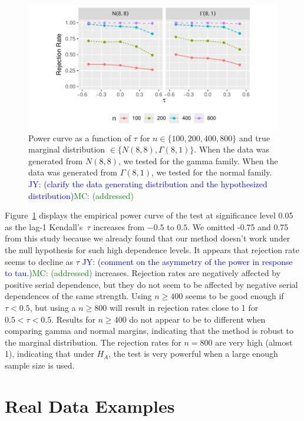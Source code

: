 \documentclass[12pt, titlepage, letterpaper]{article}
\newcommand{\jy}[1]{\textcolor{blue}{JY: (#1)}}
\newcommand{\mc}[1]{\textcolor{green}{MC: (#1)}}
\begin{document}
\begin{figure}[tbp]
  \centering
  \includegraphics[scale=1]{figures/rr}
  \caption{Power curve as a function of $\tau$ for
    $n \in \{100, 200, 400, 800\}$ and true marginal distribution 
    $\in \{N(8,8), \Gamma(8,1)\}$. When the data was generated from $N(8,8)$,
    we tested for the gamma family. When the data was generated from 
    $\Gamma(8,1)$, we tested for the normal family. \jy{clarify the data generating distribution and the
      hypothesized distribution}\mc{addressed}
  }
  \label{fig:rr}
\end{figure}


Figure~\ref{fig:rr} displays the empirical power curve of the test at
significance level 0.05 as the lag-1 Kendall's~$\tau$ increases from
$-0.5$ to $0.5$. We omitted -0.75 and 0.75 from this study because we already 
found that our method doesn't work under the null hypothesis for such high
dependence levels. It appears that rejection rate seems to decline as $\tau$
\jy{comment on the asymmetry of the power in response to tau.}\mc{addressed}
increases. Rejection rates are negatively affected by positive serial 
dependence, but they do not seem to be affected by negative serial dependences
of the same strength.
Using $n \geq 400$ seems to be good enough
if $\tau < 0.5$, but using a $n \geq 800$ will result in 
rejection rates close to 1 for $0.5 < \tau < 0.5$.
Results for $n \geq 400$
do not appear to be to different when comparing gamma and normal 
margins, indicating that the method is robust to the marginal distribution.
The rejection rates for $n = 800$ are very 
high (almost 1), indicating that under $H_A$, the test is very powerful 
when a large enough sample size is used.


\section{Real Data Examples}
\label{sec:real}
\end{document}

